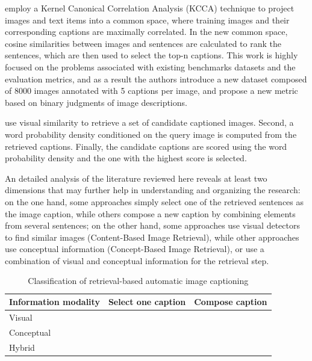\citet{Hodosh2013b} employ a Kernel Canonical Correlation Analysis (KCCA) \citep{Bach2003} technique to project images and text items into a common space, where training images and their corresponding captions are maximally correlated. In the new common space, cosine similarities between images and sentences are calculated to rank the sentences, which are then used to select the top-n captions. This work is highly focused on the problems associated with existing benchmarks datasets and the evaluation metrics, and as a result the authors introduce a new dataset composed of 8000 images annotated with 5 captions per image, and propose a new metric based on binary judgments of image descriptions.

\citet{Mason2015} use visual similarity to retrieve a set of candidate captioned images. Second, a word probability density conditioned on the query image is computed from the retrieved captions. Finally, the candidate captions are scored using the word probability density and the one with the highest score is selected. 

An detailed analysis of the literature reviewed here reveals at least two dimensions that may further help in understanding and organizing the research: on the one hand, some approaches simply select one of the retrieved sentences as the image caption, while others compose a new caption by combining elements from several sentences; on the other hand, some approaches use visual detectors to find similar images (Content-Based Image Retrieval), while other approaches use conceptual information (Concept-Based Image Retrieval), or use a combination of visual and conceptual information for the retrieval step.

\begin{table}[hpt]
    \caption{Classification of retrieval-based automatic image captioning}
    \label{tab:retrieval-classification}
    \begin{tabular}{p{40mm}|p{60mm}|p{60mm}}
        Information modality & Select one caption & Compose caption \\
        \hline
        Visual & \citet{Farhadi2010, Mason2015} & \cite{Gupta2012} \\
        \hline
        Conceptual &  \cite{Ordonez2011} & \citet{Kuznetsova2012, Kuznetsova2014} \\
        \hline
        Hybrid &  \citet{Hodosh2013b}\\

    \end{tabular}
\end{table}

